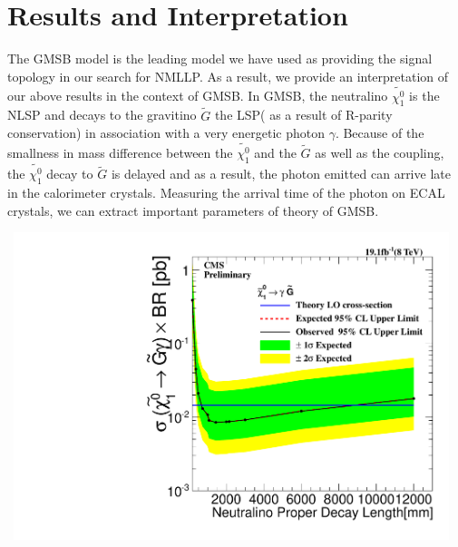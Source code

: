 \chapter{Results and Interpretation}
\label{Result_interpretation_chapter}
The GMSB model is the leading model we have used as providing the signal topology in our search for NMLLP. As a result, we provide an interpretation of our above results in the context of GMSB.
In GMSB, the neutralino $\tilde{\chi^{0}_{1}}$ is the NLSP and decays to the
gravitino $\tilde{G}$ the LSP( as a result of R-parity conservation) in association with a very energetic photon $\gamma$. Because of the smallness in mass difference between the  $\tilde{\chi^{0}_{1}}$ and the $\tilde{G}$ as well as the coupling, the $\tilde{\chi^{0}_{1}}$ decay to $\tilde{G}$ is delayed and as a result, the photon emitted can arrive late in the calorimeter crystals.  Measuring the arrival time of the photon on ECAL crystals, we can extract important parameters of  theory of GMSB.

\begin{center}
\centering
\mbox{
\includegraphics[width=5in]{THESISPLOTS/Neutralino_CrossSecTimesBR_Uplimit.pdf}}
\label{fig:SPS8_Ulimit}
\end{center}


